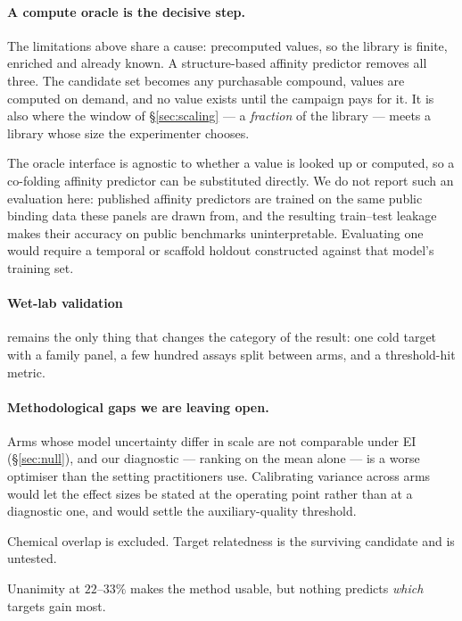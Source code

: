\documentclass[11pt]{article}
\begin{document}
\paragraph{A compute oracle is the decisive step.} The limitations above share
a cause: precomputed values, so the library is finite, enriched and already
known. A structure-based affinity predictor removes all three. The candidate set
becomes any purchasable compound, values are computed on demand, and no value
exists until the campaign pays for it. It is also where the window of
\S\ref{sec:scaling} --- a \emph{fraction} of the library --- meets a library
whose size the experimenter chooses.

The oracle interface is agnostic to whether a value is looked up or computed,
so a co-folding affinity predictor can be substituted directly. We do not report
such an evaluation here: published affinity predictors are trained on the same
public binding data these panels are drawn from, and the resulting train--test
leakage makes their accuracy on public benchmarks uninterpretable. Evaluating
one would require a temporal or scaffold holdout constructed against that
model's training set.

\paragraph{Wet-lab validation} remains the only thing that changes the
category of the result: one cold target with a family panel, a few hundred
assays split between arms, and a threshold-hit metric.

\paragraph{Methodological gaps we are leaving open.}

\begin{description}[leftmargin=2em,style=nextline,itemsep=0.3em]
  \item[A variance-calibrated acquisition.] Arms whose model uncertainty
    differ in scale are not comparable under EI (\S\ref{sec:null}), and our
    diagnostic --- ranking on the mean alone --- is a worse optimiser than the
    setting practitioners use. Calibrating variance across arms would let the
    effect sizes be stated at the operating point rather than at a diagnostic
    one, and would settle the auxiliary-quality threshold.
  \item[Why cross-family transfer fails.] Chemical overlap is excluded. Target
    relatedness is the surviving candidate and is untested.
  \item[A predictor of the per-target outcome.] Unanimity at $22$--$33\%$ makes
    the method usable, but nothing predicts \emph{which} targets gain most.
\end{description}
\end{document}
